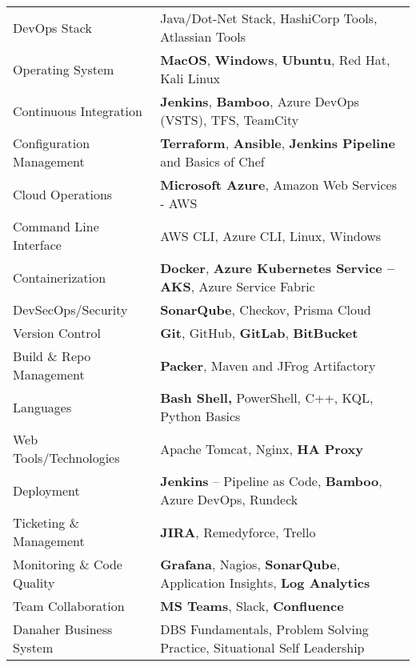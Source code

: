\documentclass[11pt, a4paper]{article}
\begin{document}
\noindent\begin{tabular}{p{1.8in}|p{4.7in}}
DevOps Stack & Java/Dot-Net Stack, HashiCorp Tools, Atlassian Tools \\
Operating System & \textbf{MacOS}, \textbf{Windows}, \textbf{Ubuntu}, Red Hat, Kali Linux \\
Continuous Integration & \textbf{Jenkins}, \textbf{Bamboo}, Azure DevOps (VSTS), TFS, TeamCity \\
Configuration Management 	& \textbf{Terraform}, \textbf{Ansible}, \textbf{Jenkins Pipeline} and Basics of Chef \\
Cloud Operations 	& \textbf{Microsoft Azure}, Amazon Web Services - AWS \\
Command Line Interface & AWS CLI, Azure CLI, Linux, Windows \\
Containerization  & \textbf{Docker}, \textbf{Azure Kubernetes Service – AKS}, Azure Service Fabric \\
DevSecOps/Security & \textbf{SonarQube},  Checkov, Prisma Cloud \\
Version Control & \textbf{Git}, GitHub, \textbf{GitLab}, \textbf{BitBucket} \\
Build \& Repo Management  & \textbf{Packer}, Maven and JFrog Artifactory \\
Languages	 & \textbf{Bash Shell,} PowerShell, C++, KQL, Python Basics \\
Web Tools/Technologies  & Apache Tomcat, Nginx, \textbf{HA Proxy} \\
Deployment & \textbf{Jenkins} – Pipeline as Code, \textbf{Bamboo}, Azure DevOps, Rundeck \\
Ticketing \& Management  & \textbf{JIRA}, Remedyforce, Trello \\
Monitoring \& Code Quality	 & \textbf{Grafana}, Nagios, \textbf{SonarQube}, Application Insights, \textbf{Log Analytics} \\
Team Collaboration & \textbf{MS Teams}, Slack, \textbf{Confluence} \\
Danaher Business System &	DBS Fundamentals, Problem Solving Practice,  Situational Self Leadership\\
\end{tabular}
\vspace{-2mm}
\end{document}
